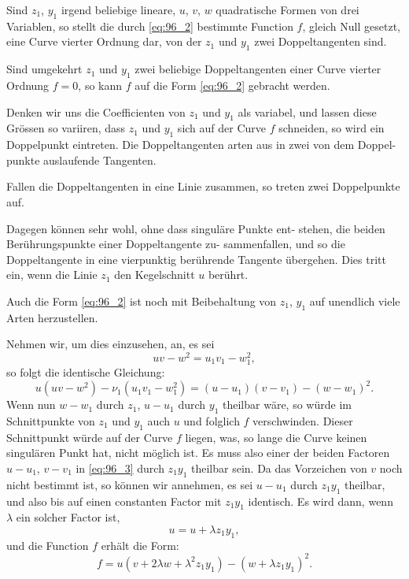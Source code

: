 \documentclass[12pt,a4paper]{article}
\theoremstyle{plain}
\theoremstyle{definition}
\theoremstyle{remark}
\begin{document}
Sind $z_1$, $y_1$ irgend beliebige lineare, $u$, $v$, $w$ quadratische
Formen von drei Variablen, so stellt die durch \eqref{eq:96_2} bestimmte
Function $f$, gleich Null gesetzt, eine Curve vierter Ordnung dar,
von der $z_1$ und $y_1$ zwei Doppeltangenten sind.

Sind umgekehrt $z_1$ und $y_1$ zwei beliebige Doppeltangenten
einer Curve vierter Ordnung $f = 0$, so kann $f$ auf die Form \eqref{eq:96_2}
gebracht werden.

Denken wir uns die Coefficienten von $z_1$ und $y_1$ als variabel,
und lassen diese Grössen so variiren, dass $z_1$ und $y_1$ sich auf
der Curve $f$ schneiden, so wird ein Doppelpunkt eintreten.
Die Doppeltangenten arten aus in zwei von dem Doppel-
punkte auslaufende Tangenten.

Fallen die Doppeltangenten in eine Linie zusammen, so
treten zwei Doppelpunkte auf.

Dagegen können sehr wohl, ohne dass singuläre Punkte ent-
stehen, die beiden Berührungspunkte einer Doppeltangente zu-
sammenfallen, und so die Doppeltangente in eine vierpunktig
berührende Tangente übergehen. Dies tritt ein, wenn die Linie $z_1$
den Kegelschnitt $u$ berührt.

Auch die Form \eqref{eq:96_2} ist noch mit Beibehaltung von $z_1$, $y_1$ auf
unendlich viele Arten herzustellen.

Nehmen wir, um dies einzusehen, an, es sei
\begin{equation*}
uv - w^2 = u_1 v_1 - w_1^2,
\end{equation*}
so folgt die identische Gleichung:
\begin{equation}\label{eq:96_3}
u(uv - w^2) - \nu_1(u_1 v_1 - w_1^2) = (u - u_1)(v - v_1) - (w - w_1)^2.
\end{equation}
Wenn nun $w - w_1$ durch $z_1$, $u - u_1$ durch $y_1$ theilbar wäre,
so würde im Schnittpunkte von $z_1$ und $y_1$ auch $u$ und folglich $f$
verschwinden. Dieser Schnittpunkt würde auf der Curve $f$ liegen,
was, so lange die Curve keinen singulären Punkt hat, nicht
möglich ist. Es muss also einer der beiden Factoren $u - u_1$,
$v - v_1$ in \eqref{eq:96_3} durch $z_1 y_1$ theilbar sein. Da das Vorzeichen von
$v$ noch nicht bestimmt ist, so können wir annehmen, es sei
$u - u_1$ durch $z_1 y_1$ theilbar, und also bis auf einen constanten
Factor mit $z_1 y_1$ identisch. Es wird dann, wenn $\lambda$ ein solcher
Factor ist,
\begin{equation*}
u = u + \lambda z_1 y_1,
\end{equation*}
und die Function $f$ erhält die Form:
\begin{equation}\label{eq:96_4}
f = u(v + 2\lambda w + \lambda^2 z_1 y_1) - (w + \lambda z_1 y_1)^2.
\end{equation}
\end{document}
